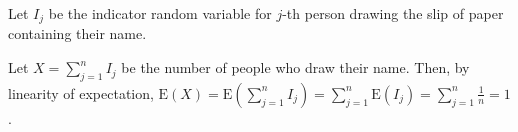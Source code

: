 Let $I_{j}$ be the indicator random variable for $j$-th person drawing the slip
of paper containing their name.

Let $X = \sum_{j=1}^{n}I_{j}$ be the number of people who draw their name. Then,
by
linearity of expectation,
$\text{E}(X) = \text{E}(\sum_{j=1}^{n}I_{j}) = \sum_{j=1}^{n}\text{E}(I_{j}) =
\sum_{j=1}^{n}\frac{1}{n} = 1$.
